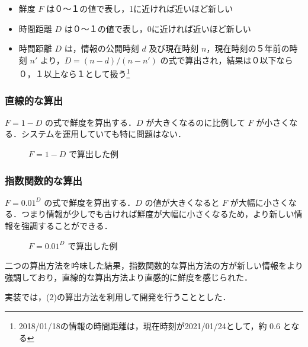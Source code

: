 \begin{itemize}
  \item 鮮度 $F$ は０～１の値で表し，1に近ければ近いほど新しい
  \item 時間距離 $D$ は０～１の値で表し，0に近ければ近いほど新しい
  \item 時間距離 $D$ は，情報の公開時刻 $d$ 及び現在時刻 $n$，現在時刻の５年前の時刻 $n'$ より，$ D =  (n - d) / (n - n') $ の式で算出され，結果は０以下なら０，１以上なら１として扱う\footnote{2018/01/18の情報の時間距離は，現在時刻が2021/01/24として，約 0.6 となる}
\end{itemize}

\subsubsection{直線的な算出}

$ F = 1 - D $ の式で鮮度を算出する．$D$ が大きくなるのに比例して $F$ が小さくなる．システムを運用していても特に問題はない．

\begin{figure}[htbp]
  \begin{center}
  \end{center}
  \caption{$ F = 1 - D $ で算出した例}
\end{figure}

\subsubsection{指数関数的な算出}

$ F =  0.01 ^ D $ の式で鮮度を算出する．$D$ の値が大きくなると $F$ が大幅に小さくなる．つまり情報が少しでも古ければ鮮度が大幅に小さくなるため，より新しい情報を強調することができる．

\begin{figure}[htbp]
  \begin{center}
  \end{center}
  \caption{$ F =  0.01 ^ D $ で算出した例}
\end{figure}


二つの算出方法を吟味した結果，指数関数的な算出方法の方が新しい情報をより強調しており，直線的な算出方法より直感的に鮮度を感じられた．

実装では，(2)の算出方法を利用して開発を行うこととした．
